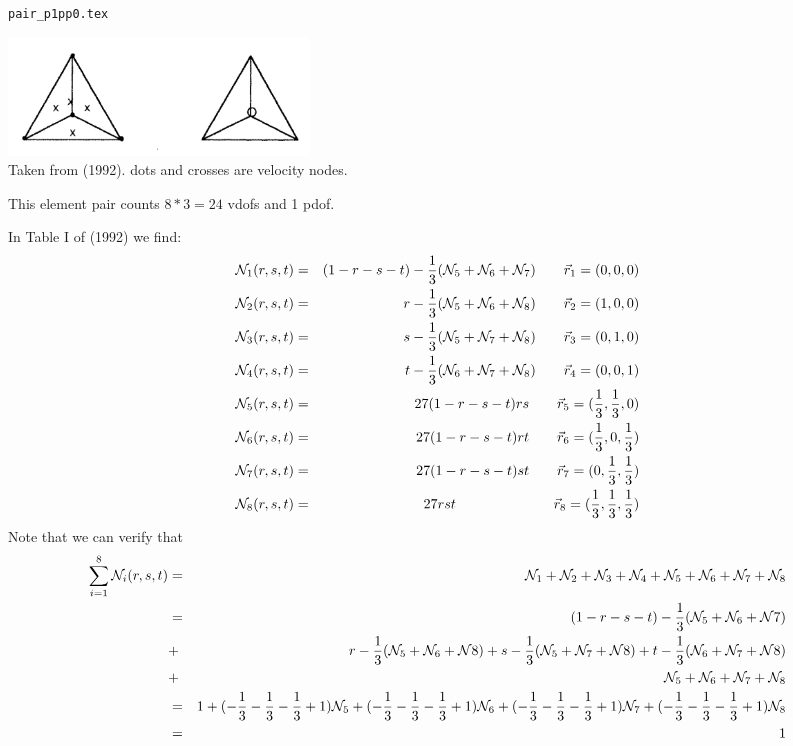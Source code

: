 \begin{flushright} {\tiny {\color{gray} \tt pair\_p1pp0.tex}} \end{flushright}

\begin{center}
\includegraphics[width=8cm]{images/pair_p1pp0/p1pp0}\\
{\captionfont Taken from \textcite{begt92} (1992). dots and crosses are
velocity nodes.}
\end{center}

This element pair counts $8*3=24$ vdofs and 1 pdof.

In Table I of \textcite{begt92} (1992) we find:
\begin{eqnarray}
{\mathcal{N}}_1(r,s,t) &=& (1-r-s-t)-\frac13 ({\mathcal{N}}_5+{\mathcal{N}}_6+{\mathcal{N}}_7) \qquad \vec{r}_1=(0,0,0) \nonumber\\
{\mathcal{N}}_2(r,s,t) &=& r-\frac13 ({\mathcal{N}}_5+{\mathcal{N}}_6+{\mathcal{N}}_8)         \qquad \vec{r}_2=(1,0,0) \nonumber\\
{\mathcal{N}}_3(r,s,t) &=& s-\frac13 ({\mathcal{N}}_5+{\mathcal{N}}_7+{\mathcal{N}}_8)         \qquad \vec{r}_3=(0,1,0) \nonumber\\
{\mathcal{N}}_4(r,s,t) &=& t-\frac13 ({\mathcal{N}}_6+{\mathcal{N}}_7+{\mathcal{N}}_8)         \qquad \vec{r}_4=(0,0,1) \nonumber\\
{\mathcal{N}}_5(r,s,t) &=& 27(1-r-s-t)rs          \qquad \vec{r}_5=(\frac13,\frac13,0) \nonumber\\
{\mathcal{N}}_6(r,s,t) &=& 27(1-r-s-t)rt          \qquad \vec{r}_6=(\frac13,0,\frac13) \nonumber\\
{\mathcal{N}}_7(r,s,t) &=& 27(1-r-s-t)st          \qquad \vec{r}_7=(0,\frac13,\frac13) \nonumber\\
{\mathcal{N}}_8(r,s,t) &=& 27rst  \qquad\qquad\qquad\quad \vec{r}_8=(\frac13,\frac13,\frac13) 
\end{eqnarray}
Note that we can verify that
\begin{eqnarray}
\sum_{i=1}^8 {\mathcal{N}}_i(r,s,t) 
&=& {\mathcal{N}}_1 +{\mathcal{N}}_2 +{\mathcal{N}}_3 +{\mathcal{N}}_4 +{\mathcal{N}}_5 +{\mathcal{N}}_6 +{\mathcal{N}}_7 +{\mathcal{N}}_8 \nonumber\\
&=& (1-r-s-t)-\frac13 ({\mathcal{N}}_5+{\mathcal{N}}_6+{\mathcal{N}}7) \nonumber\\
&+& r-\frac13 ({\mathcal{N}}_5+{\mathcal{N}}_6+{\mathcal{N}}8)  
 +  s-\frac13 ({\mathcal{N}}_5+{\mathcal{N}}_7+{\mathcal{N}}8) 
 +  t-\frac13 ({\mathcal{N}}_6+{\mathcal{N}}_7+{\mathcal{N}}8) \nonumber\\
&+& {\mathcal{N}}_5 + {\mathcal{N}}_6 + {\mathcal{N}}_7 + {\mathcal{N}}_8  \nonumber\\
&=& 1
+(-\frac13 -\frac13 -\frac13+1){\mathcal{N}}_5
+(-\frac13 -\frac13 -\frac13+1){\mathcal{N}}_6
+(-\frac13 -\frac13 -\frac13+1){\mathcal{N}}_7
+(-\frac13 -\frac13 -\frac13+1){\mathcal{N}}_8 \nonumber\\
&=& 1
\end{eqnarray}

